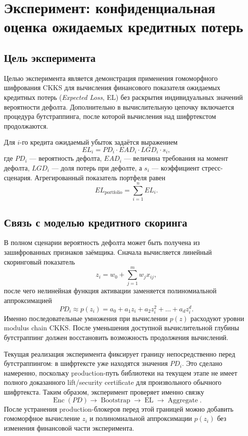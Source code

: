 \section{Эксперимент: конфиденциальная оценка ожидаемых кредитных потерь}

\subsection{Цель эксперимента}

Целью эксперимента является демонстрация применения гомоморфного шифрования
CKKS для вычисления финансового показателя ожидаемых кредитных потерь
(\emph{Expected Loss}, EL) без раскрытия индивидуальных значений вероятности
дефолта. Дополнительно в вычислительную цепочку включается процедура
бутстраппинга, после которой вычисления над шифртекстом продолжаются.

Для $i$-го кредита ожидаемый убыток задаётся выражением
\[
    EL_i = PD_i \cdot EAD_i \cdot LGD_i \cdot s_i,
\]
где $PD_i$ --- вероятность дефолта,
$EAD_i$ --- величина требования на момент дефолта,
$LGD_i$ --- доля потерь при дефолте,
а $s_i$ --- коэффициент стресс-сценария.
Агрегированный показатель портфеля равен
\[
    EL_{\mathrm{portfolio}}
    = \sum_{i=1}^{n} EL_i.
\]

\subsection{Связь с моделью кредитного скоринга}

В полном сценарии вероятность дефолта может быть получена из зашифрованных
признаков заёмщика. Сначала вычисляется линейный скоринговый показатель
\[
    z_i = w_0 + \sum_{j=1}^{m} w_j x_{ij},
\]
после чего нелинейная функция активации заменяется полиномиальной
аппроксимацией
\[
    PD_i \approx p(z_i)
    = a_0 + a_1 z_i + a_2 z_i^2 + \ldots + a_d z_i^d.
\]
Именно последовательные умножения при вычислении $p(z)$ расходуют уровни
modulus chain CKKS. После уменьшения доступной вычислительной глубины
бутстраппинг должен восстановить возможность продолжения вычислений.

Текущая реализация эксперимента фиксирует границу непосредственно перед
бутстраппингом: в шифртексте уже находятся значения $PD_i$. Это сделано
намеренно, поскольку production-путь библиотеки на текущем этапе не имеет
полного доказанного lift/security certificate для произвольного обычного
шифртекста. Таким образом, эксперимент проверяет именно связку
\[
    \operatorname{Enc}(PD)
    \longrightarrow \operatorname{Bootstrap}
    \longrightarrow \operatorname{EL}
    \longrightarrow \operatorname{Aggregate}.
\]
После устранения production-блокеров перед этой границей можно добавить
гомоморфное вычисление $z_i$ и полиномиальной аппроксимации $p(z_i)$ без
изменения финансовой части эксперимента.

